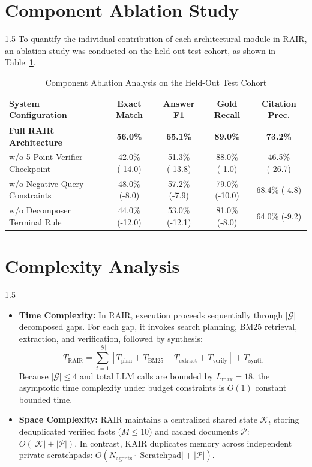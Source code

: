 \documentclass[12pt,a4paper]{report}
\begin{document}
\section{Component Ablation Study}
\begin{spacing}{1.5}
To quantify the individual contribution of each architectural module in RAIR, an ablation study was conducted on the held-out test cohort, as shown in Table~\ref{tab:ablation}.

\begin{table}[!htbp]
\centering
\small
\begin{tabular}{|l|c|c|c|c|}
\hline
\textbf{System Configuration} & \textbf{Exact Match} & \textbf{Answer F1} & \textbf{Gold Recall} & \textbf{Citation Prec.} \\
\hline
\textbf{Full RAIR Architecture} & \textbf{56.0\%} & \textbf{65.1\%} & \textbf{89.0\%} & \textbf{73.2\%} \\
\hline
w/o 5-Point Verifier Checkpoint & 42.0\% (-14.0) & 51.3\% (-13.8) & 88.0\% (-1.0) & 46.5\% (-26.7) \\
\hline
w/o Negative Query Constraints & 48.0\% (-8.0) & 57.2\% (-7.9) & 79.0\% (-10.0) & 68.4\% (-4.8) \\
\hline
w/o Decomposer Terminal Rule & 44.0\% (-12.0) & 53.0\% (-12.1) & 81.0\% (-8.0) & 64.0\% (-9.2) \\
\hline
\end{tabular}
\caption{Component Ablation Analysis on the Held-Out Test Cohort}
\label{tab:ablation}
\end{table}
\end{spacing}

\section{Complexity Analysis}
\begin{spacing}{1.5}
\begin{itemize}
    \item \textbf{Time Complexity:} In RAIR, execution proceeds sequentially through $|\mathcal{G}|$ decomposed gaps. For each gap, it invokes search planning, BM25 retrieval, extraction, and verification, followed by synthesis:
    \begin{equation}
    T_{\text{RAIR}} = \sum_{t=1}^{|\mathcal{G}|} \left[ T_{\text{plan}} + T_{\text{BM25}} + T_{\text{extract}} + T_{\text{verify}} \right] + T_{\text{synth}}
    \end{equation}
    Because $|\mathcal{G}| \le 4$ and total LLM calls are bounded by $L_{\max} = 18$, the asymptotic time complexity under budget constraints is $O(1)$ constant bounded time.
    \item \textbf{Space Complexity:} RAIR maintains a centralized shared state $\mathcal{K}_t$ storing deduplicated verified facts ($M \le 10$) and cached documents $\mathcal{P}$: $O(|\mathcal{K}| + |\mathcal{P}|)$. In contrast, KAIR duplicates memory across independent private scratchpads: $O(N_{\text{agents}} \cdot |\text{Scratchpad}| + |\mathcal{P}|)$.
\end{itemize}
\end{spacing}
\end{document}

